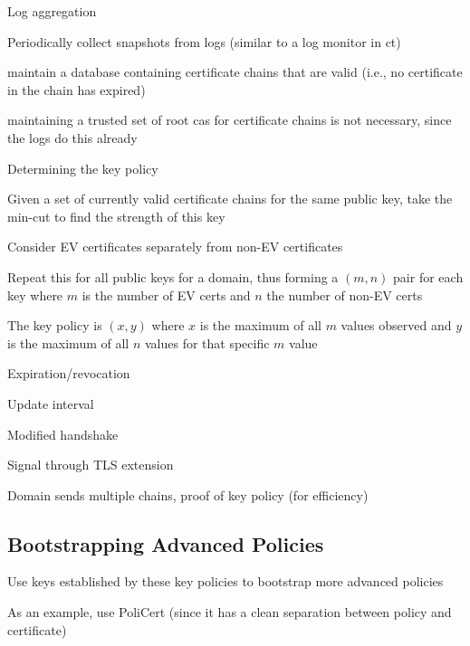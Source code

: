 \begin{compactitem}
\item Log aggregation
  \begin{compactitem}
  \item Periodically collect snapshots from logs (similar to a log monitor in
    \ac{ct})
  \item maintain a database containing certificate chains that are valid (i.e.,
    no certificate in the chain has expired)
  \item maintaining a trusted set of root \acp{ca} for certificate chains is not
    necessary, since the logs do this already
  \end{compactitem}
\item Determining the key policy
  \begin{compactitem}
  \item Given a set of currently valid certificate chains for the same public
    key, take the min-cut to find the strength of this key
  \item Consider EV certificates separately from non-EV certificates
  \item Repeat this for all public keys for a domain, thus forming a $(m, n)$
    pair for each key where $m$ is the number of EV certs and $n$ the number of
    non-EV certs
  \item The key policy is $(x, y)$ where $x$ is the maximum of all $m$ values
    observed and $y$ is the maximum of all $n$ values for that specific $m$
    value
  \end{compactitem}
\item Expiration/revocation
\item Update interval
\item Modified handshake
  \begin{compactitem}
  \item Signal through TLS extension
  \item Domain sends multiple chains, proof of key policy (for efficiency)
  \end{compactitem}
\end{compactitem}

\subsection{Bootstrapping Advanced Policies}
\label{sec:design:bootstrapping}

\begin{compactitem}
\item Use keys established by these key policies to bootstrap more advanced
  policies
\item As an example, use PoliCert (since it has a clean separation between
  policy and certificate)
\end{compactitem}
